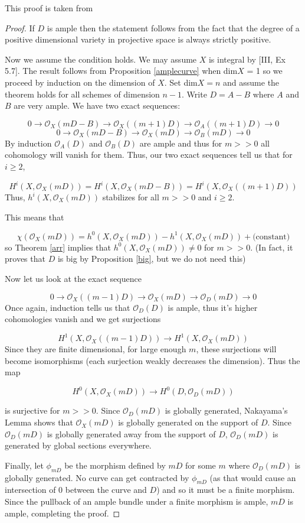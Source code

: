 \documentclass[a4paper]{article}
\newcommand{\Oc}{\mathcal{O}}
\numberwithin{theorem}{section}
\begin{document}
This proof is taken from \cite{MR2095471}

\begin{proof}
If $D$ is ample then the statement follows from the fact that the degree of a positive dimensional variety in projective space is always strictly positive. 

Now we assume the condition holds. We may assume $X$ is integral by \cite{Hartshorne77}[III, Ex 5.7]. The result follows from Proposition \ref{amplecurve} when dim$X$ = 1 so we proceed by induction on the dimension of $X$. Set dim$X = n$ and assume the theorem holds for all schemes of dimension $n-1$. Write $D = A-B$ where $A$ and $B$ are very ample. We have two exact sequences:

$$ 0 \rightarrow \Oc_X(mD-B) \rightarrow \Oc_X((m+1)D) \rightarrow \Oc_A((m+1)D) \rightarrow 0 $$
$$ 0 \rightarrow \Oc_X(mD-B) \rightarrow \Oc_X(mD) \rightarrow \Oc_B(mD) \rightarrow 0 $$
By induction $\Oc_A(D)$ and $\Oc_B(D)$ are ample and thus for $m >> 0$ all cohomology will vanish for them. Thus, our two exact sequences tell us that for $i \geq 2$,

$$ H^i(X, \Oc_X(mD)) = H^i(X, \Oc_X(mD-B)) = H^i(X, \Oc_X((m+1)D)) $$
Thus, $h^i(X, \Oc_X(mD))$ stabilizes for all $m >> 0$ and $i \geq 2$.

This means that

$$ \chi( \Oc_X(mD)) = h^0(X, \Oc_X(mD)) - h^1(X, \Oc_X(mD)) + \text{(constant)} $$so Theorem \ref{arr} implies that $h^0(X, \Oc_X(mD)) \neq 0$ for $m >>0$. (In fact, it proves that $D$ is big by Proposition \ref{big}, but we do not need this)

Now let us look at the exact sequence

$$ 0 \rightarrow \Oc_X((m-1)D) \rightarrow \Oc_X(mD) \rightarrow \Oc_D(mD) \rightarrow 0 $$
Once again, induction tells us that $\Oc_D(D)$ is ample, thus it's higher cohomologies vanish and we get surjections

$$ H^1(X, \Oc_X((m-1)D)) \rightarrow H^1(X, \Oc_X(mD)) $$
Since they are finite dimensional, for large enough $m$, these surjections will become isomorphisms (each surjection weakly decreases the dimension). Thus the map

$$  H^0(X, \Oc_X(mD)) \rightarrow H^0(D, \Oc_D(mD))  $$

is surjective for $m>>0$. Since $\Oc_D(mD)$ is globally generated, Nakayama's Lemma shows that $\Oc_X(mD)$ is globally generated on the support of $D$. Since $\Oc_D(mD)$ is globally generated away from the support of $D$, $\Oc_D(mD)$ is generated by global sections everywhere.

Finally, let $\phi_{mD}$ be the morphism defined by $mD$ for some $m$ where $\Oc_D(mD)$ is globally generated. No curve can get contracted by $\phi_{mD}$ (as that would cause an intersection of 0 between the curve and $D$) and so it must be a finite morphism. Since the pullback of an ample bundle under a finite morphism is ample, $mD$ is ample, completing the proof.

\end{proof}
\end{document}
